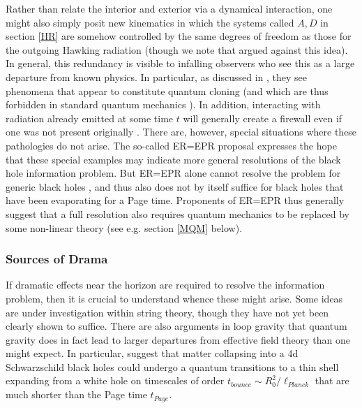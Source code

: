 \documentclass[10pt]{article}
\begin{document}
Rather than relate the interior and exterior via a dynamical interaction, one might also simply posit new kinematics in which the systems called $A,D$ in section \ref{HR} are somehow controlled by the same degrees of freedom as those for the outgoing Hawking radiation \cite{Bousso:2012as,Nomura:2012sw,Papadodimas:2012aq,Nomura:2012cx,Harlow:2013tf,Susskind:2013tg}  (though we note that \cite{Bousso:2012as} argued against this idea). In general, this redundancy is visible to infalling observers who see this as a large departure from known physics.  In particular, as discussed in \cite{Almheiri:2013hfa}, they see phenomena that appear to constitute quantum cloning (and which are thus forbidden in standard quantum mechanics \cite{Wootters:1982zz,Dieks:1982dj}).  In addition, interacting with radiation already emitted at some time $t$ will generally create a firewall even if one was not present originally \cite{Almheiri:2013hfa,Bousso:2013wia,Bousso:2013ifa}.  There are, however, special situations \cite{Maldacena:2013xja} where these pathologies do not arise.   The so-called ER=EPR proposal expresses the hope that these special examples may indicate more general resolutions of the black hole information problem.   But ER=EPR alone cannot resolve the problem for generic black holes \cite{BoussoTalk,Marolf:2013dba,Bousso:2013wia,Bousso:2013ifa}, and thus also does not by itself suffice for black holes that have been evaporating for a Page time.  Proponents of ER=EPR thus generally suggest \cite{Susskind:2014moa} that a full resolution also requires quantum mechanics to be replaced by some non-linear theory (see e.g. section \ref{MQM} below).



\subsubsection{Sources of Drama}

If dramatic effects near the horizon are required to resolve the information problem, then it is crucial to understand whence these might arise.  Some ideas \cite{Giveon:2012kp,Silverstein:2014yza} are under investigation within string theory, though they have not yet been clearly shown to suffice.    There are also arguments in loop gravity that quantum gravity does in fact lead to larger departures from effective field theory than one might expect.  In particular, \cite{Rovelli:2014cta,Haggard:2014rza,Christodoulou:2016vny} suggest that matter collapsing into a 4d Schwarzschild black holes could undergo a quantum transitions to a thin shell expanding from a white hole on timescales of order $t_{bounce} \sim R_0^2/\ell_{Planck}$ that are much shorter than the Page time $t_{Page}$.
\end{document}
